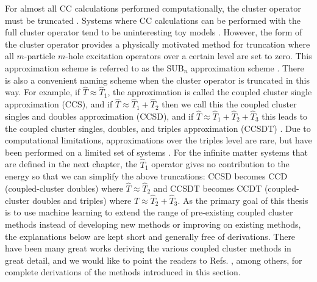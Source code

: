 For almost all CC calculations performed computationally, the cluster operator must be truncated \cite{Ref7}. Systems where CC calculations can be performed with the full cluster operator tend to be uninteresting toy models \cite{Ref8}. However, the form of the cluster operator provides a physically motivated method for truncation where all $m$-particle $m$-hole excitation operators over a certain level are set to zero. This approximation scheme is referred to as the SUB$_n$ approximation scheme \cite{Ref8}. There is also a convenient naming scheme when the cluster operator is truncated in this way. For example, if $\hat{T} \approx \hat{T}_1$, the approximation is called the coupled cluster single approximation (CCS), and if $\hat{T} \approx \hat{T}_1 + \hat{T}_2$ then we call this the coupled cluster singles and doubles approximation (CCSD), and if $\hat{T} \approx \hat{T}_1 + \hat{T}_2 + \hat{T}_3$ this leads to the coupled cluster singles, doubles, and triples approximation (CCSDT) \cite{Ref6}. Due to computational limitations, approximations over the triples level are rare, but have been performed on a limited set of systems \cite{Ref95}. For the infinite matter systems that are defined in the next chapter, the $\hat{T}_1$ operator gives no contribution to the energy so that we can simplify the above truncations: CCSD becomes CCD (coupled-cluster doubles) where $\hat{T} \approx \hat{T}_2$ and CCSDT becomes CCDT (coupled-cluster doubles and triples) where $\hat{T} \approx \hat{T}_2 + \hat{T}_3$. As the primary goal of this thesis is to use machine learning to extend the range of pre-existing coupled cluster methods instead of developing new methods or improving on existing methods, the explanations below are kept short and generally free of derivations. There have been many great works deriving the various coupled cluster methods in great detail, and we would like to point the readers to Refs. \cite{Ref21, Ref155, Ref149}, among others, for complete derivations of the methods introduced in this section.

